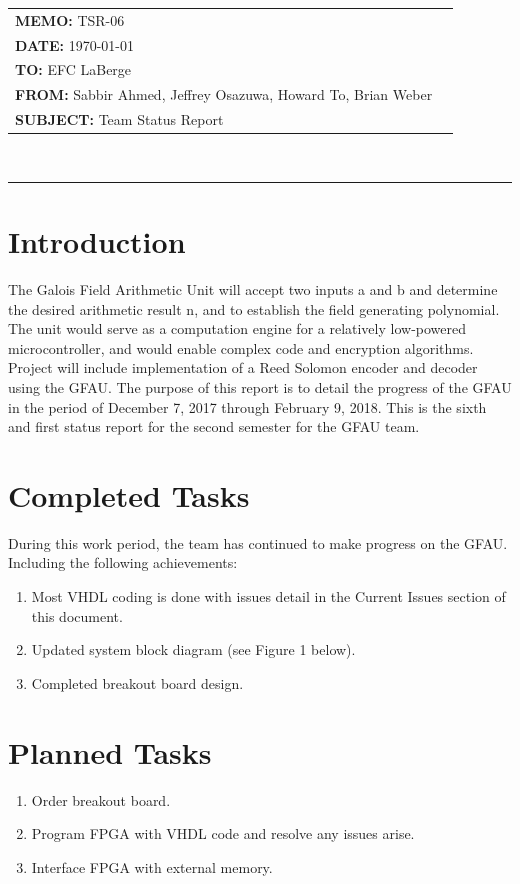 \documentclass[paper=usletter, fontsize=12pt]{article}
\newcommand{\Sabbir}{Sabbir Ahmed}
\newcommand{\Jeffrey}{Jeffrey Osazuwa}
\newcommand{\Howard}{Howard To}
\newcommand{\Brian}{Brian Weber}
\newcommand{\documentinfo}[5]{
    \begin{centering}
        \parbox{6.8in}{
        \begin{spacing}{1}
            \begin{flushleft}
                \begin{tabular}{l l} #1 \\ #2 \\ #3 \\ #4 \\ #5 \\
                \end{tabular} \\
                \rule{\textwidth}{1pt}
            \end{flushleft}
        \end{spacing} }
    \end{centering} }
\begin{document}
    \documentinfo{\textbf{MEMO:} TSR-06}{\textbf{DATE: }{\today}}{\textbf{TO: }
    EFC LaBerge}{\textbf{FROM: }\Sabbir, \Jeffrey, \Howard,
    \Brian}{\textbf{SUBJECT: } Team Status Report}
    \vspace{-0.3in}

    \section{Introduction} The Galois Field Arithmetic Unit will accept two inputs
    a and b and determine the desired arithmetic result n, and to establish the field generating polynomial. The unit would serve as a computation engine for a relatively low-powered
    microcontroller, and would enable complex code and encryption algorithms.
    Project will include implementation of a Reed Solomon encoder and decoder
    using the GFAU. The purpose of this report is to detail the progress of the
    GFAU in the period of December 7, 2017 through February 9, 2018. This is
    the sixth and first status report for the second semester for the GFAU
    team.

    \section{Completed Tasks} During this work period, the team has continued
    to make progress on the GFAU. Including the following achievements:
    \begin{enumerate}[label=\alph*)]

        \item Most VHDL coding is done with issues detail in the Current Issues section of this document. 
        \item Updated system block diagram (see Figure 1 below). 
        \item Completed breakout board design. 
        
    \end{enumerate}

    \section{Planned Tasks}
   
    \begin{enumerate}[label=\alph*)]

        \item Order breakout board.
        \item Program FPGA with VHDL code and resolve any issues arise. 
        \item Interface FPGA with external memory.

    \end{enumerate}
\end{document}

